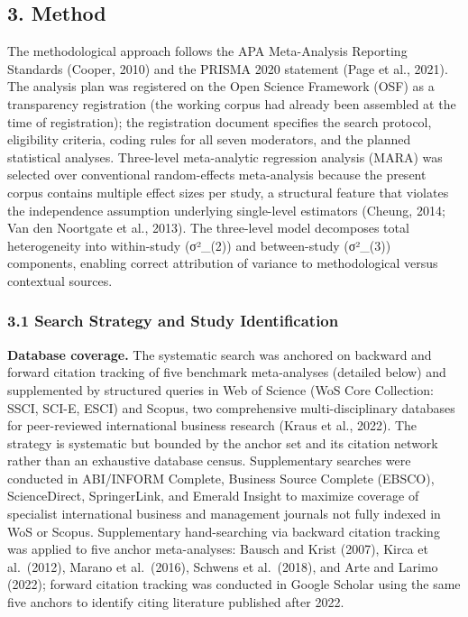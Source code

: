 \documentclass[
  12pt,a4paper]{article}
\begin{document}
\hypertarget{method}{%
\subsection{3. Method}\label{method}}

The methodological approach follows the APA Meta-Analysis Reporting
Standards (Cooper, 2010) and the PRISMA 2020 statement (Page et al.,
2021). The analysis plan was registered on the Open Science Framework
(OSF) as a transparency registration (the working corpus had already
been assembled at the time of registration); the registration document
specifies the search protocol, eligibility criteria, coding rules for
all seven moderators, and the planned statistical analyses. Three-level
meta-analytic regression analysis (MARA) was selected over conventional
random-effects meta-analysis because the present corpus contains
multiple effect sizes per study, a structural feature that violates the
independence assumption underlying single-level estimators (Cheung,
2014; Van den Noortgate et al., 2013). The three-level model decomposes
total heterogeneity into within-study (σ²\_(2)) and between-study
(σ²\_(3)) components, enabling correct attribution of variance to
methodological versus contextual sources.

\hypertarget{search-strategy-and-study-identification}{%
\subsubsection{3.1 Search Strategy and Study
Identification}\label{search-strategy-and-study-identification}}

\textbf{Database coverage.} The systematic search was anchored on
backward and forward citation tracking of five benchmark meta-analyses
(detailed below) and supplemented by structured queries in Web of
Science (WoS Core Collection: SSCI, SCI-E, ESCI) and Scopus, two
comprehensive multi-disciplinary databases for peer-reviewed
international business research (Kraus et al., 2022). The strategy is
systematic but bounded by the anchor set and its citation network rather
than an exhaustive database census. Supplementary searches were
conducted in ABI/INFORM Complete, Business Source Complete (EBSCO),
ScienceDirect, SpringerLink, and Emerald Insight to maximize coverage of
specialist international business and management journals not fully
indexed in WoS or Scopus. Supplementary hand-searching via backward
citation tracking was applied to five anchor meta-analyses: Bausch and
Krist (2007), Kirca et al.~(2012), Marano et al.~(2016), Schwens et
al.~(2018), and Arte and Larimo (2022); forward citation tracking was
conducted in Google Scholar using the same five anchors to identify
citing literature published after 2022.
\end{document}
